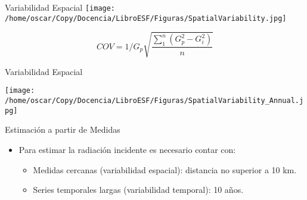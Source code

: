 \documentclass[xcolor={usenames,svgnames,dvipsnames}]{beamer}
\begin{document}
\begin{frame}[label=sec-1-4]{Variabilidad Espacial}
\texttt{[image: /home/oscar/Copy/Docencia/LibroESF/Figuras/SpatialVariability.jpg]}

\[
COV = 1/G_p \sqrt{\frac{\sum_1^{n}(G_p^2 - G_i^2)}{n}}
\]

\nocite{Gueymard.Wilcox2011a}
\end{frame}
\begin{frame}[label=sec-1-5]{Variabilidad Espacial}
\begin{center}
\texttt{[image: /home/oscar/Copy/Docencia/LibroESF/Figuras/SpatialVariability\_Annual.jpg]}
\end{center}
\end{frame}
\begin{frame}[label=sec-1-6]{Estimación a partir de Medidas}
\begin{itemize}
\item Para estimar la radiación incidente es necesario contar con:
\begin{itemize}
\item \alert{Medidas cercanas} (variabilidad espacial): distancia no superior a 10 km.
\item \alert{Series temporales} largas (variabilidad temporal): 10 años.
\end{itemize}
\end{itemize}
\end{frame}
\end{document}
